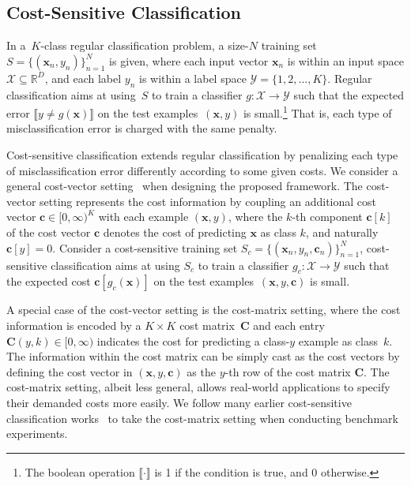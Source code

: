 \documentclass[a4paper]{article}
\begin{document}
\subsection{Cost-Sensitive Classification}
  \label{sec:CSC}
  In a~$K$-class regular classification problem, a size-$N$ training set $S = \{(\mathbf{x}_{n}, y_{n})\}_{n = 1} ^ {N}$ is given, where each input vector $\mathbf{x}_{n}$ is within an input space $\mathcal{X}\subseteq \mathbb{R} ^ {D}$, and each label $y_{n}$ is within a label space $\mathcal{Y} = \{1, 2, ..., K\}$.
  Regular classification aims at using~$S$ to train a classifier $g\colon \mathcal{X} \rightarrow \mathcal{Y}$ such that the expected error $\llbracket y\neq g(\mathbf{x})\rrbracket$ on the test examples~$(\mathbf{x}, y)$ is small.\footnote{The boolean operation $\llbracket \cdot \rrbracket$ is 1 if the condition is true, and 0 otherwise.}
  That is, each type of misclassification error is charged with the same penalty.

  Cost-sensitive classification extends regular classification by penalizing each type of misclassification error differently according to some given costs.
  We consider a general cost-vector setting~\cite{kukar1998cost,HT2010} when designing the proposed framework.
  The cost-vector setting represents the cost information by coupling an additional cost vector $\mathbf{c} \in [0, \infty) ^ {K}$ with each example $(\mathbf{x}, y)$, where the $k$-th component $\mathbf{c}[k]$ of the cost vector $\mathbf{c}$ denotes the cost of predicting $\mathbf{x}$ as class $k$, and naturally $\mathbf{c}[y] = 0$.
  Consider a cost-sensitive training set $S_{c} = \{(\mathbf{x}_{n}, y_{n}, \mathbf{c}_{n})\}_{n = 1} ^ {N}$, cost-sensitive classification aims at using $S_{c}$ to train a classifier $g_{c}\colon \mathcal{X} \rightarrow \mathcal{Y}$ such that the expected cost $\mathbf{c}[g_{c}(\mathbf{x})]$ on the test examples~$(\mathbf{x}, y, \mathbf{c})$ is small.

  A special case of the cost-vector setting is the cost-matrix setting, where the cost information is encoded by a $K \times K$ cost matrix~$\mathbf{C}$ and each entry $\mathbf{C}(y, k) \in [0, \infty)$ indicates the cost for predicting a class-$y$ example as class~$k$.
  The information within the cost matrix can be simply cast as the cost vectors by defining the cost vector in $(\mathbf{x}, y, \mathbf{c})$ as the $y$-th row of the cost matrix $\mathbf{C}$.
  The cost-matrix setting, albeit less general, allows real-world applications to specify their demanded costs more easily.
  We follow many earlier cost-sensitive classification works~\cite{kukar1998cost,domingos1999metacost,abe2004iterative,HT2010,YC2016} to take the cost-matrix setting when conducting benchmark experiments.
  
\end{document}
